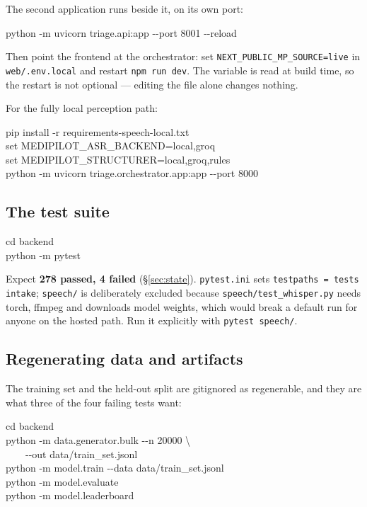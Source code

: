 \documentclass[10pt,a4paper,twocolumn]{article}
\newcommand{\pth}[1]{\textcolor{SecPurple}{\texttt{#1}}}
\newcommand{\cm}[1]{\texttt{#1}}
\begin{document}
\noindent The second application runs beside it, on its own port:

\begin{tcolorbox}[mpcode]
python -m uvicorn triage.api:app -{}-port 8001 -{}-reload
\end{tcolorbox}

\noindent Then point the frontend at the orchestrator: set \cm{NEXT\_PUBLIC\_MP\_SOURCE=live} in
\pth{web/.env.local} and restart \cm{npm run dev}. The variable is read at build time, so the
restart is not optional --- editing the file alone changes nothing.

For the fully local perception path:

\begin{tcolorbox}[mpcode]
pip install -r requirements-speech-local.txt\\
set MEDIPILOT\_ASR\_BACKEND=local,groq\\
set MEDIPILOT\_STRUCTURER=local,groq,rules\\
python -m uvicorn triage.orchestrator.app:app -{}-port 8000
\end{tcolorbox}

\subsection{The test suite}
\begin{tcolorbox}[mpcode]
cd backend\\
python -m pytest
\end{tcolorbox}

\noindent Expect \textbf{278 passed, 4 failed} (\S\ref{sec:state}). \pth{pytest.ini} sets
\cm{testpaths = tests intake}; \pth{speech/} is deliberately excluded because
\pth{speech/test\_whisper.py} needs torch, ffmpeg and downloads model weights, which would break a
default run for anyone on the hosted path. Run it explicitly with \cm{pytest speech/}.

\subsection{Regenerating data and artifacts}
The training set and the held-out split are gitignored as regenerable, and they are what three of
the four failing tests want:

\begin{tcolorbox}[mpcode]
cd backend\\
python -m data.generator.bulk -{}-n 20000 \textbackslash\\
\ \ \ \ -{}-out data/train\_set.jsonl\\
python -m model.train -{}-data data/train\_set.jsonl\\
python -m model.evaluate\\
python -m model.leaderboard
\end{tcolorbox}
\end{document}
